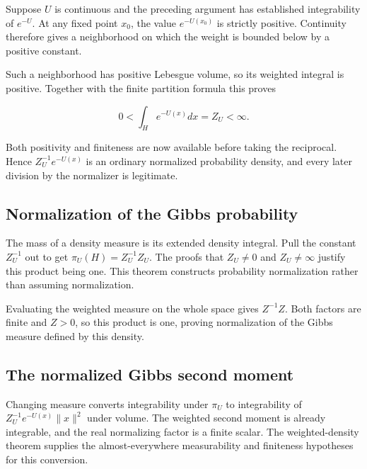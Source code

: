\documentclass[11pt,a4paper]{report}
\begin{document}
Suppose \(U\) is continuous and the preceding argument has established integrability of \(e^{-U}\). At any fixed point \(x_0\), the value \(e^{-U(x_0)}\) is strictly positive. Continuity therefore gives a neighborhood on which the weight is bounded below by a positive constant.



Such a neighborhood has positive Lebesgue volume, so its weighted integral is positive. Together with the finite partition formula this proves

\[0<\int_H e^{-U(x)}dx=Z_U<\infty.\]


Both positivity and finiteness are now available before taking the reciprocal. Hence \(Z_U^{-1}e^{-U(x)}\) is an ordinary normalized probability density, and every later division by the normalizer is legitimate.

\subsection{\texorpdfstring{Normalization of the Gibbs probability}{Normalization of the Gibbs probability}}
\label{report-step-UnadjustedLangevin-Gibbs-lean-13}


The mass of a density measure is its extended density integral. Pull the constant \(Z_U^{-1}\) out to get \(\pi_U(H)=Z_U^{-1}Z_U\). The proofs that \(Z_U\ne0\) and \(Z_U\ne\infty\) justify this product being one. This theorem constructs probability normalization rather than assuming normalization.



Evaluating the weighted measure on the whole space gives \(Z^{-1}Z\). Both factors are finite and \(Z>0\), so this product is one, proving normalization of the Gibbs measure defined by this density.

\subsection{\texorpdfstring{The normalized Gibbs second moment}{The normalized Gibbs second moment}}
\label{report-step-UnadjustedLangevin-Gibbs-lean-14}


Changing measure converts integrability under \(\pi_U\) to integrability of \(Z_U^{-1}e^{-U(x)}\|x\|^2\) under volume. The weighted second moment is already integrable, and the real normalizing factor is a finite scalar. The weighted-density theorem supplies the almost-everywhere measurability and finiteness hypotheses for this conversion.
\end{document}

